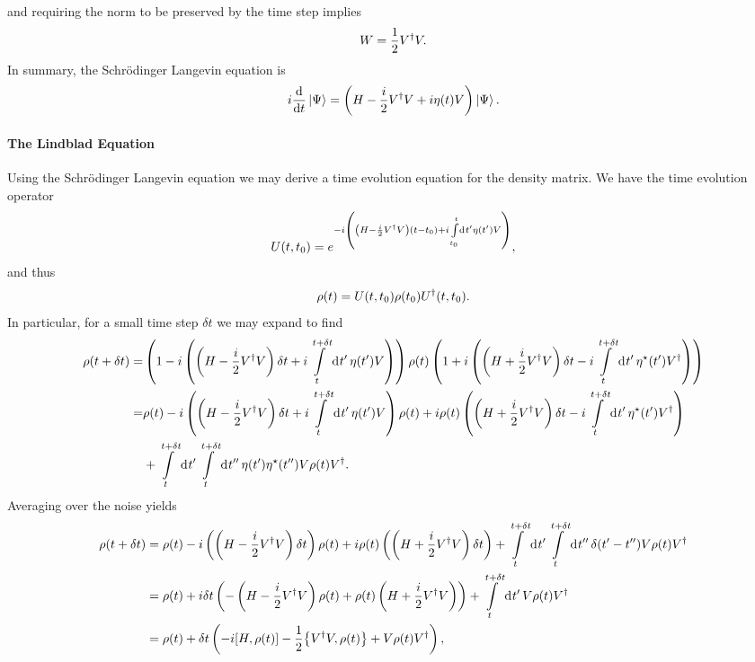and requiring the norm to be preserved by the time step implies
\begin{align*}
	W = \frac{1}{2}V^{\dagger} V.
\end{align*}
In summary, the Schrödinger Langevin equation is
\begin{align*}
	i\dv{t}\ket{\Psi} = \left(H - \frac{i}{2}V^{\dagger} V + i\eta(t)V\right)\ket{\Psi}.
\end{align*}

\paragraph{The Lindblad Equation}
Using the Schrödinger Langevin equation we may derive a time evolution equation for the density matrix. We have the time evolution operator
\begin{align*}
	U(t, t_{0}) = e^{-i\left(\left(H - \frac{i}{2}V^{\dagger} V\right)(t - t_{0}) + i\int\limits_{t_{0}}^{t}\dd[]{t\ensuremath{^{\prime}}}\eta(t^{\prime})V\right)},
\end{align*}
and thus
\begin{align*}
	\rho(t) = U(t, t_{0})\rho(t_{0})U^{\dagger}(t, t_{0}).
\end{align*}
In particular, for a small time step $\delta t$ we may expand to find
\begin{align*}
	\rho(t + \delta t) =& \left(1 - i\left(\left(H - \frac{i}{2}V^{\dagger} V\right)\delta t + i\int\limits_{t}^{t + \delta t}\dd[]{t\ensuremath{^{\prime}}}\eta(t^{\prime})V\right)\right)\rho(t)\left(1 + i\left(\left(H + \frac{i}{2}V^{\dagger} V\right)\delta t - i\int\limits_{t}^{t + \delta t}\dd[]{t\ensuremath{^{\prime}}}\eta^{\star}(t^{\prime})V^{\dagger}\right)\right) \\
	                   =& \rho(t) - i\left(\left(H - \frac{i}{2}V^{\dagger} V\right)\delta t + i\int\limits_{t}^{t + \delta t}\dd[]{t\ensuremath{^{\prime}}}\eta(t^{\prime})V\right)\rho(t) + i\rho(t)\left(\left(H + \frac{i}{2}V^{\dagger} V\right)\delta t - i\int\limits_{t}^{t + \delta t}\dd[]{t\ensuremath{^{\prime}}}\eta^{\star}(t^{\prime})V^{\dagger}\right) \\
	                    &+ \int\limits_{t}^{t + \delta t}\dd[]{t\ensuremath{^{\prime}}}\int\limits_{t}^{t + \delta t}\dd[]{t^{\prime\prime}}\eta(t^{\prime})\eta^{\star}(t^{\prime\prime})V\rho(t)V^{\dagger}.
\end{align*}
Averaging over the noise yields
\begin{align*}
	\rho(t + \delta t) &= \rho(t) - i\left(\left(H - \frac{i}{2}V\adj V\right)\delta t\right)\rho(t) + i\rho(t)\left(\left(H + \frac{i}{2}V\adj V\right)\delta t\right) + \integ{t}{t + \delta t}{t\p}{\integ{t}{t + \delta t}{t^{\prime\prime}}{\delta(t\p - t^{\prime\prime})V\rho(t)V\adj}} \\
	                   &= \rho(t) + i\delta t\left(-\left(H - \frac{i}{2}V\adj V\right)\rho(t) + \rho(t)\left(H + \frac{i}{2}V\adj V\right)\right) + \integ{t}{t + \delta t}{t\p}{V\rho(t)V\adj} \\
	                   &= \rho(t) + \delta t\left(-i\comm{H}{\rho(t)} - \frac{1}{2}\acomm{V\adj V}{\rho(t)} + V\rho(t)V\adj\right),
\end{align*}
